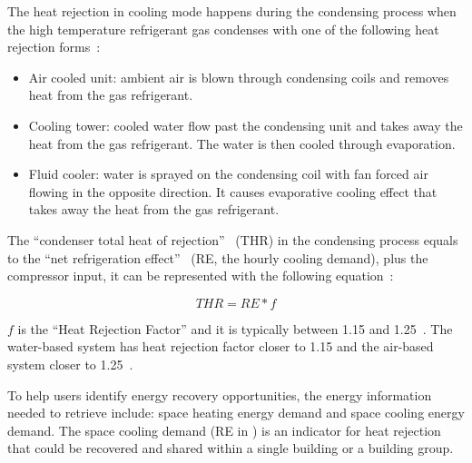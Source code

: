 The heat rejection in cooling mode happens during the condensing
process when the high temperature refrigerant gas condenses with one
of the following heat rejection forms~\cite{Bhatia2015}:
\begin{itemize}
\item Air cooled unit: ambient air is blown through condensing coils
  and removes heat from the gas refrigerant.
\item Cooling tower: cooled water flow past the condensing unit and
  takes away the heat from the gas refrigerant. The water is then
  cooled through evaporation.
\item Fluid cooler: water is sprayed on the condensing coil with fan
  forced air flowing in the opposite direction. It causes evaporative
  cooling effect that takes away the heat from the gas refrigerant.
\end{itemize}
The ``condenser total heat of rejection''~\cite{Bhatia2015} (THR) in
the condensing process equals to the ``net refrigeration effect''
~\cite{Bhatia2015}(RE, the hourly cooling demand), plus the compressor
input, it can be represented with the following equation~\cite{Bhatia2015}:

\begin{equation}\label{eq:reject}
THR = RE * f 
\end{equation}

$f$ is the ``Heat Rejection Factor'' and it is typically between 1.15
and 1.25~\cite{Bhatia2015}. The water-based system has heat rejection
factor closer to 1.15 and the air-based system closer to
1.25~\cite{Bhatia2015}.

To help users identify energy recovery opportunities, the energy
information needed to retrieve include: space heating energy demand
and space cooling energy demand. The space cooling demand (RE in
) is an indicator for heat rejection that could be
recovered and shared within a single building or a building group.

